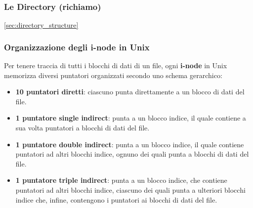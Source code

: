 \subsubsection{Le Directory (richiamo)}
\ref{sec:directory_structure}


\subsubsection{Organizzazione degli i-node in Unix}
Per tenere traccia di tutti i blocchi di dati di un file, ogni \textbf{i-node} in Unix memorizza diversi puntatori organizzati secondo uno schema gerarchico:
\begin{itemize}
    \item \textbf{10 puntatori diretti}: ciascuno punta direttamente a un blocco di dati del file.
    \item \textbf{1 puntatore single indirect}: punta a un blocco indice, il quale contiene a sua volta puntatori a blocchi di dati del file.
    \item \textbf{1 puntatore double indirect}: punta a un blocco indice, il quale contiene puntatori ad altri blocchi indice, ognuno dei quali punta a blocchi di dati del file.
    \item \textbf{1 puntatore triple indirect}: punta a un blocco indice, che contiene puntatori ad altri blocchi indice, ciascuno dei quali punta a ulteriori blocchi indice che, infine, contengono i puntatori ai blocchi di dati del file.
\end{itemize}

